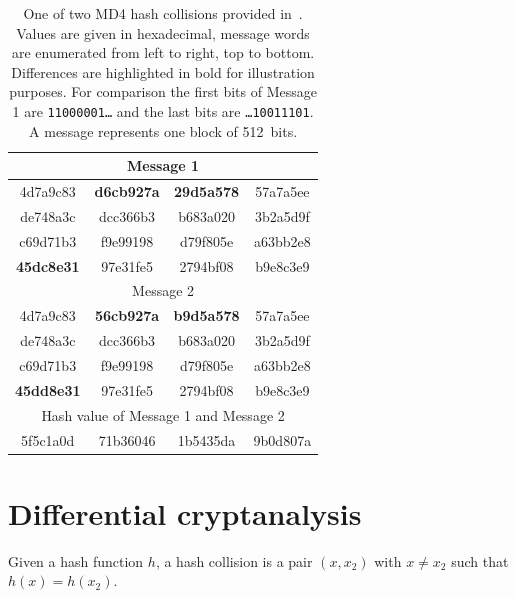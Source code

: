 \begin{table}[bt]
  \begin{center}
    \begin{tabular}{cccc}
      \hline \hline
      \multicolumn{4}{c}{Message 1} \\
      \hline
      4d7a9c83 & \textbf{d6cb927a} & \textbf{29d5a578} & 57a7a5ee \\
      de748a3c & dcc366b3 & b683a020 & 3b2a5d9f \\
      c69d71b3 & f9e99198 & d79f805e & a63bb2e8 \\
      \textbf{45dc8e31} & 97e31fe5 & 2794bf08 & b9e8c3e9 \\
      \hline
      \multicolumn{4}{c}{Message 2} \\
      \hline
      4d7a9c83 & \textbf{56cb927a} & \textbf{b9d5a578} & 57a7a5ee \\
      de748a3c & dcc366b3 & b683a020 & 3b2a5d9f \\
      c69d71b3 & f9e99198 & d79f805e & a63bb2e8 \\
      \textbf{45dd8e31} & 97e31fe5 & 2794bf08 & b9e8c3e9 \\
      \hline
      \multicolumn{4}{c}{Hash value of Message 1 and Message 2} \\
      \hline
      5f5c1a0d & 71b36046 & 1b5435da & 9b0d807a \\
      \hline \hline
    \end{tabular}
    \caption[Hexadecimal values of one MD4 collisions given in paper~\cite{wang2004}]{
      One of two MD4 hash collisions provided in~\cite{wang2004}.
      Values are given in hexadecimal, message words are enumerated from
      left to right, top to bottom. Differences are highlighted in
      bold for illustration purposes. For comparison the first bits
      of Message 1 are \texttt{11000001\dots} and the last bits are
      \texttt{\dots10011101}.
      A message represents one block of 512~bits.
    }
    \label{tab:wang-md4-collision1}
  \end{center}
\end{table}

\newpage
\section{Differential cryptanalysis}
\label{sec:intro-diff-cryptanalysis}
%
\begin{defi}
  Given a hash function $h$,
  a hash collision is a pair $(x, x_2)$ with $x \neq x_2$ such that
  $h(x) = h(x_2)$.
\end{defi}

